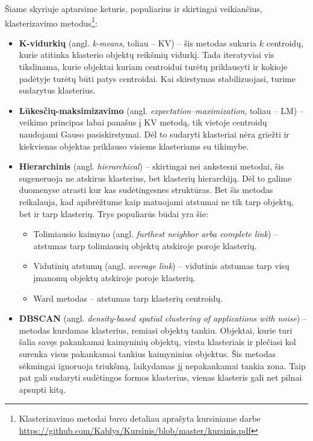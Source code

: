 \documentclass{VUMIFInfBakalaurinis}
\begin{document}
Šiame skyriuje aptarsime keturis, populiarius \cite{wu2008top} ir skirtingai veikiančius, klasterizavimo
metodus\footnote{Klasterizavimo metodai buvo detaliau
  aprašyta kursiniame darbe \url{https://github.com/Kablys/Kursinis/blob/master/kursinis.pdf}}:

\begin{itemize}
\item
  \textbf{K-vidurkių} (angl. \emph{k-means}, toliau -- KV) -- šis
  metodas sukuria $k$ centroidų, kurie atitinka klasterio objektų
  reikšmių vidurkį. Tada iteratyviai vis tikslinama, kurie objektai
  kuriam centroidui turėtų priklausyti ir kokioje padėtyje turėtų būti
  patys centroidai. Kai skirstymas stabilizuojasi, turime sudarytus
  klasterius.
\item
  \textbf{Lūkesčių-maksimizavimo} (angl.
  \emph{expectation--maximization}, toliau -- LM) -- veikimo principas
  labai panašus į KV metodą, tik vietoje centroidų naudojami Gauso
  pasiskirstymai. Dėl to sudaryti klasteriai nėra griežti ir kiekvienas
  objektas priklauso visiems klasteriams su tikimybe.
\item
  \textbf{Hierarchinis} (angl. \emph{hierarchical}) -- skirtingai nei
  ankstesni metodai, šis sugeneruoja ne atskirus klasterius, bet
  klasterių hierarchiją. Dėl to galime duomenyse atrasti kur kas
  sudėtingesnes struktūras. Bet šis metodas reikalauja, kad apibrėžtume
  kaip matuojami atstumai ne tik tarp objektų, bet ir tarp klasterių.
  Trys populiarūs būdai yra šie:

  \begin{itemize}
  \item
    Tolimiausio kaimyno (angl. \emph{furthest neighbor arba complete
    link}) -- atstumas tarp tolimiausių objektų atskiroje poroje
    klasterių.
  \item
    Vidutinių atstumų (angl. \emph{average link}) -- vidutinis atstumas
    tarp visų įmanomų objektų atskiroje poroje klasterių.
  \item
    Ward metodas -- atstumas tarp klasterių centroidų.
  \end{itemize}
\item
  \textbf{DBSCAN} (angl. \emph{density-based spatial clustering of
  applications with noise}) -- metodas kurdamas klasterius, remiasi
  objektų tankiu. Objektai, kurie turi šalia savęs pakankamai kaimyninių
  objektų, virsta klasteriais ir plečiasi kol surenka visus pakankamai
  tankius kaimyninius objektus. Šis metodas sėkmingai ignoruoja
  triukšmą, laikydamas jį nepakankamai tankia zona. Taip pat gali
  sudaryti sudėtingos formos klasterius, vienas klasteris gali net
  pilnai apsupti kitą.
\end{itemize}
\end{document}

